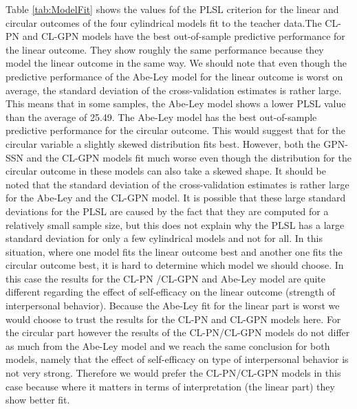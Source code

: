 \documentclass[man,mask]{apa6}
\begin{document}
Table \ref{tab:ModelFit} shows the values fof the PLSL criterion for the linear
and circular outcomes of the four cylindrical models fit to the teacher
data.\newline \indent The CL-PN and CL-GPN models have the best out-of-sample
predictive performance for the linear outcome. They show roughly the same
performance because they model the linear outcome in the same way. We should
note that even though the predictive performance of the Abe-Ley model for the
linear outcome is worst on average, the standard deviation of the
cross-validation estimates is rather large. This means that in some samples, the
Abe-Ley model shows a lower PLSL value than the average of 25.49.\newline
\indent The Abe-Ley model has the best out-of-sample predictive performance for
the circular outcome. This would suggest that for the circular variable a
slightly skewed distribution fits best. However, both the GPN-SSN and the
CL-GPN models fit much worse even though the distribution for the circular
outcome in these models can also take a skewed shape. It should be noted that
the standard deviation of the cross-validation estimates is rather large for
the Abe-Ley and the CL-GPN model. It is possible that these large standard
deviations for the PLSL are caused by the fact that they are computed for a
relatively small sample size, but this does not explain why the PLSL has a large
standard deviation for only a few cylindrical models and not for all.\newline
\indent In this situation, where one model fits the linear outcome best and
another one fits the circular outcome best, it is hard to determine which model
we should choose. In this case the results for the CL-PN /CL-GPN and Abe-Ley
model are quite different regarding the effect of self-efficacy on the linear
outcome (strength of interpersonal behavior). Because the Abe-Ley fit for the
linear part is worst we would choose to trust the results for the CL-PN and
CL-GPN models here. For the circular part however the results of the CL-PN/CL-GPN
models do not differ as much from the Abe-Ley model and we reach the same
conclusion for both models, namely that the effect of self-efficacy on type of
interpersonal behavior is not very strong. Therefore we would prefer the
CL-PN/CL-GPN models in this case because where it matters in terms of
interpretation (the linear part) they show better fit.
\end{document}
